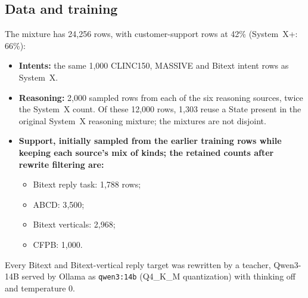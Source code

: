 \documentclass[11pt]{article}
\newcommand{\sysplus}{System~X+}
\begin{document}
\subsection{Data and training}
The mixture has 24{,}256 rows, with customer-support rows at 42\% (\sysplus: 66\%):
\begin{itemize}
\item \textbf{Intents:} the same 1{,}000 CLINC150, MASSIVE and Bitext intent rows as System~X.
\item \textbf{Reasoning:} 2{,}000 sampled rows from each of the six reasoning sources, twice the System~X count. Of these 12{,}000 rows, 1{,}303 reuse a State present in the original System~X reasoning mixture; the mixtures are not disjoint.
\item \textbf{Support, initially sampled from the earlier training rows while keeping each source's mix of kinds; the retained counts after rewrite filtering are:}
  \begin{itemize}
  \item Bitext reply task: 1{,}788 rows;
  \item ABCD: 3{,}500;
  \item Bitext verticals: 2{,}968;
  \item CFPB: 1{,}000.
  \end{itemize}
\end{itemize}
Every Bitext and Bitext-vertical reply target was rewritten by a teacher, Qwen3-14B \citep{yang2025qwen3} served by Ollama as \texttt{qwen3:14b} (Q4\_K\_M quantization) with thinking off and temperature 0.
\end{document}
